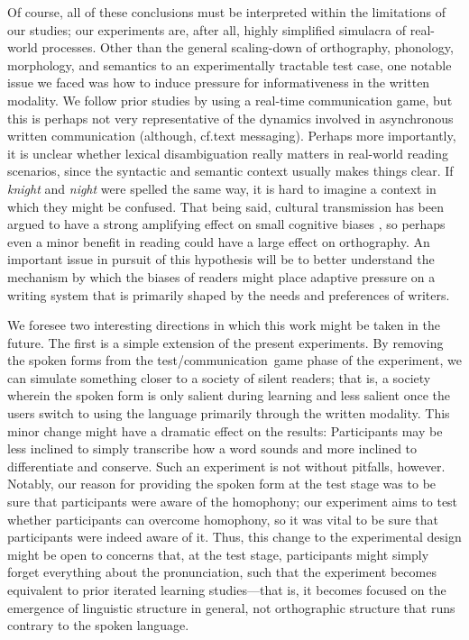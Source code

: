 \documentclass[doc,biblatex]{apa7}
\begin{document}
Of course, all of these conclusions must be interpreted within the limitations of our studies; our experiments are, after all, highly simplified simulacra of real-world processes. Other than the general scaling-down of orthography, phonology, morphology, and semantics to an experimentally tractable test case, one notable issue we faced was how to induce pressure for informativeness in the written modality. We follow prior studies by using a real-time communication game, but this is perhaps not very representative of the dynamics involved in asynchronous written communication (although, cf.\@ text messaging). Perhaps more importantly, it is unclear whether lexical disambiguation really matters in real-world reading scenarios, since the syntactic and semantic context usually makes things clear. If \textit{knight} and \textit{night} were spelled the same way, it is hard to imagine a context in which they might be confused. That being said, cultural transmission has been argued to have a strong amplifying effect on small cognitive biases \parencite{Thompson:2016}, so perhaps even a minor benefit in reading could have a large effect on orthography. An important issue in pursuit of this hypothesis will be to better understand the mechanism by which the biases of readers might place adaptive pressure on a writing system that is primarily shaped by the needs and preferences of writers.



We foresee two interesting directions in which this work might be taken in the future. The first is a simple extension of the present experiments. By removing the spoken forms from the test/communication~game phase of the experiment, we can simulate something closer to a society of silent readers; that is, a society wherein the spoken form is only salient during learning and less salient once the users switch to using the language primarily through the written modality. This minor change might have a dramatic effect on the results: Participants may be less inclined to simply transcribe how a word sounds and more inclined to differentiate and conserve. Such an experiment is not without pitfalls, however. Notably, our reason for providing the spoken form at the test stage was to be sure that participants were aware of the homophony; our experiment aims to test whether participants can overcome homophony, so it was vital to be sure that participants were indeed aware of it. Thus, this change to the experimental design might be open to concerns that, at the test stage, participants might simply forget everything about the pronunciation, such that the experiment becomes equivalent to prior iterated learning studies---that is, it becomes focused on the emergence of linguistic structure in general, not orthographic structure that runs contrary to the spoken language.
\end{document}

